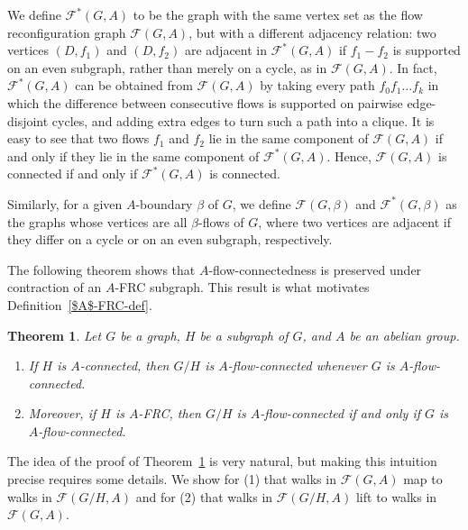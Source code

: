 \documentclass[a4paper,12pt]{article}
\theoremstyle{plain}
\newtheorem{theorem}{Theorem}[section]
\theoremstyle{definition}
\newcommand\F{\mathcal{F}}
\begin{document}
We define $\F^*(G,A)$ to be the graph with the same vertex set as the flow reconfiguration graph $\F(G,A)$, but with a different adjacency relation: two vertices $(D,f_1)$ and $(D,f_2)$ are adjacent in $\F^*(G,A)$ if $f_1-f_2$ is supported on an even subgraph, rather than merely on a cycle, as in $\F(G,A)$. In fact, $\F^*(G,A)$ can be obtained from $\F(G,A)$ by taking every path $f_0 f_1 \dots f_k$ in which the difference between consecutive flows is supported on pairwise edge-disjoint cycles, and adding extra edges to turn such a path into a clique. It is easy to see that two flows $f_1$ and $f_2$ lie in the same component of $\F(G,A)$ if and only if they lie in the same component of $\F^*(G,A)$. Hence, $\F(G,A)$ is connected if and only if $\F^*(G,A)$ is connected.

Similarly, for a given $A$-boundary $\beta$ of $G$, we define $\F(G,\beta)$ and $\F^*(G,\beta)$ as the graphs whose vertices are all $\beta$-flows of $G$, where two vertices are adjacent if they differ on a cycle or on an even subgraph, respectively.

The following theorem shows that $A$-flow-connectedness is preserved under contraction of an $A$-FRC subgraph.
This result is what motivates
Definition~\ref{$A$-FRC-def}.

\begin{theorem}
\label{AFRC-thm}
Let $G$ be a graph, $H$ be a subgraph of $G$, and $A$ be an abelian group.
\begin{enumerate}[label=(\arabic*)]
    \item\label{AFRC-thm-1} If $H$ is $A$-connected, then $G/H$ is $A$-flow-connected whenever $G$ is $A$-flow-connected.
    \item\label{AFRC-thm-2} Moreover, if $H$ is $A$-FRC, then $G/H$ is $A$-flow-connected if and only if $G$ is $A$-flow-connected.
\end{enumerate}
\end{theorem}

The idea of the proof of Theorem~\ref{AFRC-thm} is very natural, but making this intuition precise requires some details.
We show for (1) that walks in $\F(G,A)$ map to walks in $\F(G/H,A)$ and for (2) that walks in
$\F(G/H,A)$ lift to walks in $\F(G,A)$.
\end{document}
